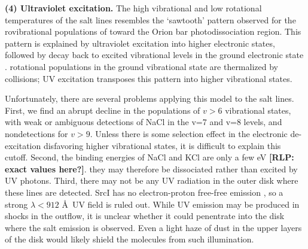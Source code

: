 \documentclass[twocolumn]{aastex62}
\newcommand{\sourcei}{SrcI\xspace}
\newcommand{\rlp}[1]{\textcolor{blue!65!black}{\textbf{[RLP: #1]}}}
\begin{document}
\par{\textbf{(4) Ultraviolet excitation.}}
%
%
The high vibrational and low rotational temperatures of the
salt lines resembles the `sawtooth' pattern observed for the rovibrational
populations of \hh toward the Orion bar photodissociation region.  This
pattern is explained by ultraviolet excitation into higher electronic states,
followed by decay back to excited vibrational levels in the ground electronic
state \citep{Kaplan2017a}.  \hh rotational populations in the ground vibrational
state are thermalized by collisions; UV excitation transposes this pattern into
higher vibrational states.


Unfortunately, there are several problems applying this model to the salt lines.
First, we find an abrupt decline in the populations of $v > 6$ vibrational states,
with weak or ambiguous detections of NaCl in the v=7 and v=8 levels, and
nondetections for $v > 9$.  Unless there is
some selection effect in the electronic de-excitation disfavoring higher vibrational
states, it is difficult to explain this cutoff.  
Second, the binding energies of NaCl and KCl are only a few eV  \rlp{exact values here?}. 
they may therefore be dissociated rather than excited by UV photons.
Third, there may not be any UV radiation in the outer disk where these lines
are detected.  \sourcei has no electron-proton free-free emission
\citep{Plambeck2013a}, so a strong $\lambda<912$ \AA\ UV field is ruled out.  While UV
emission may be produced in shocks in the outflow, it is unclear whether
it could penentrate into the disk where
the salt emission is observed.  Even a light haze of dust in the upper layers of
the disk would likely shield the molecules from such illumination.
\end{document}

